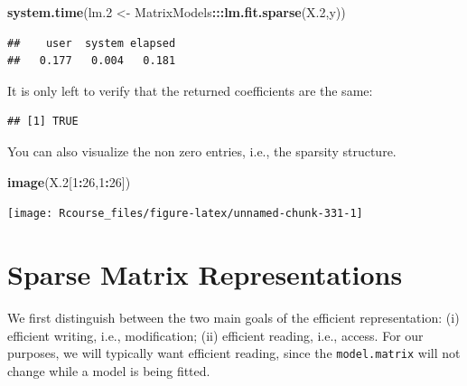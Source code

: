\documentclass[]{book}
\newenvironment{Shaded}{\begin{snugshade}}{\end{snugshade}}
\newcommand{\KeywordTok}[1]{\textcolor[rgb]{0.13,0.29,0.53}{\textbf{#1}}}
\newcommand{\DataTypeTok}[1]{\textcolor[rgb]{0.13,0.29,0.53}{#1}}
\newcommand{\DecValTok}[1]{\textcolor[rgb]{0.00,0.00,0.81}{#1}}
\newcommand{\FloatTok}[1]{\textcolor[rgb]{0.00,0.00,0.81}{#1}}
\newcommand{\StringTok}[1]{\textcolor[rgb]{0.31,0.60,0.02}{#1}}
\newcommand{\OperatorTok}[1]{\textcolor[rgb]{0.81,0.36,0.00}{\textbf{#1}}}
\newcommand{\NormalTok}[1]{#1}
\theoremstyle{definition}
\theoremstyle{definition}
\theoremstyle{definition}
\theoremstyle{remark}
\begin{document}
\begin{Shaded}
\begin{Highlighting}[]
\KeywordTok{system.time}\NormalTok{(lm.}\DecValTok{2}\NormalTok{ <-}\StringTok{ }\NormalTok{MatrixModels}\OperatorTok{:::}\KeywordTok{lm.fit.sparse}\NormalTok{(X.}\DecValTok{2}\NormalTok{,y))}
\end{Highlighting}
\end{Shaded}

\begin{verbatim}
##    user  system elapsed 
##   0.177   0.004   0.181
\end{verbatim}

It is only left to verify that the returned coefficients are the same:

\begin{Shaded}
\end{Shaded}

\begin{verbatim}
## [1] TRUE
\end{verbatim}

You can also visualize the non zero entries, i.e., the sparsity
structure.

\begin{Shaded}
\begin{Highlighting}[]
\KeywordTok{image}\NormalTok{(X.}\DecValTok{2}\NormalTok{[}\DecValTok{1}\OperatorTok{:}\DecValTok{26}\NormalTok{,}\DecValTok{1}\OperatorTok{:}\DecValTok{26}\NormalTok{])}
\end{Highlighting}
\end{Shaded}

\texttt{[image: Rcourse\_files/figure-latex/unnamed-chunk-331-1]}

\section{Sparse Matrix
Representations}\label{sparse-matrix-representations}

We first distinguish between the two main goals of the efficient
representation: (i) efficient writing, i.e., modification; (ii)
efficient reading, i.e., access. For our purposes, we will typically
want efficient reading, since the \texttt{model.matrix} will not change
while a model is being fitted.
\end{document}
